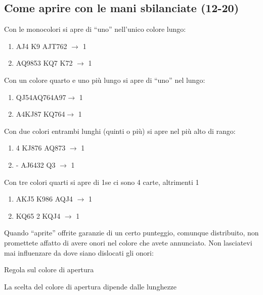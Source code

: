 \documentclass[../corsofiori.tex]{subfiles}
\begin{document}
\subsection{
Come aprire con le mani sbilanciate (12-20)
}
Con le monocolori si apre di “uno” nell’unico colore lungo:

\begin{enumerate}[label={}]
\item {} {AJ4} {K9} {AJT762} $\rightarrow$ 1\Cl

\item {} {AQ9853} {KQ7} {K72} $\rightarrow$ 1\He
\end{enumerate}

Con un colore quarto e uno più lungo si apre di “uno” nel lungo:

\begin{enumerate}[label={}]
\item {} {QJ54}{AQ764}{A97}$\rightarrow$ 1\Di

\item {} {A4}{KJ87} {KQ764}$\rightarrow$ 1\Cl
\end{enumerate}




Con due colori entrambi lunghi (quinti o più) si apre nel più alto di rango:

\begin{enumerate}[label={}]
\item {} {4} {KJ876} {AQ873} $\rightarrow$ 1\Di



\item {} {-} {AJ6432} {Q3} $\rightarrow$ 1\Sp

\end{enumerate}
Con tre colori quarti si apre di 1\Di se ci sono 4 carte, altrimenti 1\Cl

\begin{enumerate}[label={}]
\item {} {AKJ5} {K986} {AQJ4} $\rightarrow$ 1\Di

\item {} {KQ65} {2} {KQJ4} $\rightarrow$ 1\Cl
\end{enumerate}

Quando “aprite” offrite garanzie di un certo punteggio, comunque distribuito, non promettete affatto di avere onori nel
colore che avete annunciato. Non lasciatevi
mai influenzare da dove siano dislocati gli onori:
\begin{regola}{Regola sul colore di apertura}
    
La scelta del colore di apertura dipende dalle lunghezze
\end{regola}
\end{document}
